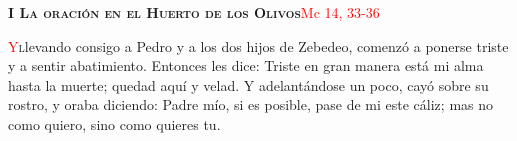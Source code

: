 \noindent\textbf{\textsc{I La oración en el Huerto de los Olivos}}\hfill\textcolor{red}{Mc 14, 33-36}

\vspace{0.25em}

\lettrine[lines=2]{\textcolor{red}{Y}} llevando consigo a Pedro y a los dos hijos de Zebedeo, comenzó a ponerse triste y a sentir abatimiento.
Entonces les dice: Triste en gran manera está mi alma hasta la muerte; quedad aquí y velad. Y adelantándose un poco, cayó sobre su rostro, y oraba
diciendo: Padre mío, si es posible, pase de mi este cáliz; mas no como quiero, sino como quieres tu.